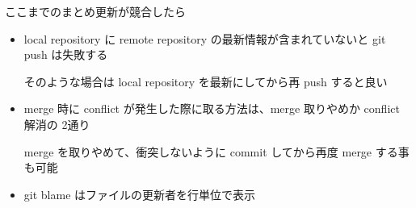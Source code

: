 % 
% 
% 
% 

\begin{frame}[t]{ここまでのまとめ}{更新が競合したら}

  \begin{itemize}
  \item local repository に remote repository の最新情報が含まれていないと git push は失敗する

    そのような場合は local repository を最新にしてから再 push すると良い
    \vspace{2ex}

  \item merge 時に conflict が発生した際に取る方法は、merge 取りやめか conflict 解消の 2通り

    merge を取りやめて、衝突しないように commit してから再度 merge する事も可能
    \vspace{2ex}

  \item git blame はファイルの更新者を行単位で表示
  \end{itemize}

\end{frame}
